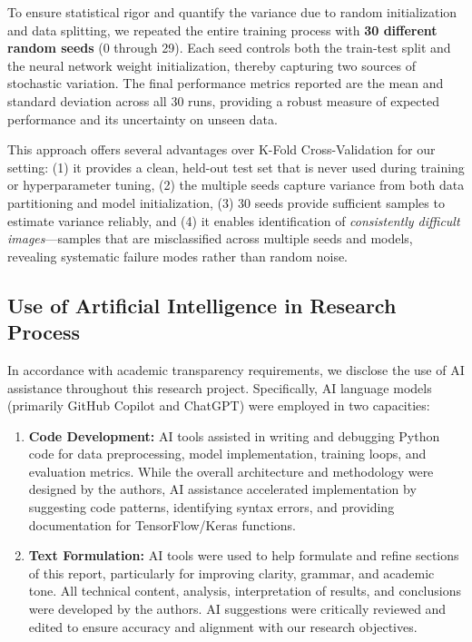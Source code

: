 \documentclass[12pt,a4paper]{article}
\begin{document}
To ensure statistical rigor and quantify the variance due to random initialization and data splitting, we repeated the entire training process with \textbf{30 different random seeds} (0 through 29). Each seed controls both the train-test split and the neural network weight initialization, thereby capturing two sources of stochastic variation. The final performance metrics reported are the mean and standard deviation across all 30 runs, providing a robust measure of expected performance and its uncertainty on unseen data.

This approach offers several advantages over K-Fold Cross-Validation for our setting: (1) it provides a clean, held-out test set that is never used during training or hyperparameter tuning, (2) the multiple seeds capture variance from both data partitioning and model initialization, (3) 30 seeds provide sufficient samples to estimate variance reliably, and (4) it enables identification of \emph{consistently difficult images}---samples that are misclassified across multiple seeds and models, revealing systematic failure modes rather than random noise.

\subsection{Use of Artificial Intelligence in Research Process}
In accordance with academic transparency requirements, we disclose the use of AI assistance throughout this research project. Specifically, AI language models (primarily GitHub Copilot and ChatGPT) were employed in two capacities:

\begin{enumerate}
    \item \textbf{Code Development:} AI tools assisted in writing and debugging Python code for data preprocessing, model implementation, training loops, and evaluation metrics. While the overall architecture and methodology were designed by the authors, AI assistance accelerated implementation by suggesting code patterns, identifying syntax errors, and providing documentation for TensorFlow/Keras functions.
    \item \textbf{Text Formulation:} AI tools were used to help formulate and refine sections of this report, particularly for improving clarity, grammar, and academic tone. All technical content, analysis, interpretation of results, and conclusions were developed by the authors. AI suggestions were critically reviewed and edited to ensure accuracy and alignment with our research objectives.
\end{enumerate}
\end{document}
